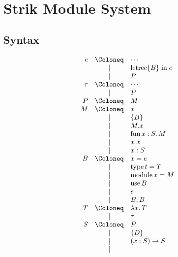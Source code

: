 \section{Strik Module System}

\subsection{Syntax}

\begin{align*}
  \begin{array}{rcl}
  e
  & \Coloneq & \cdots \\
  & \mid & \symletrec \{B\} \symin e \\
  & \mid & P \\
  \tau
  & \Coloneq & \cdots \\
  & \mid & P \\
  P
  & \Coloneq & M \\
  M
  & \Coloneq & x \\
  & \mid & \{B\} \\
  & \mid & M.x \\
  & \mid & \symfun x: S\ldotp M \\
  & \mid & x\; x \\
  & \mid & x: S \\
  B
  & \Coloneq & x = e \\
  & \mid & \symtype t = T \\
  & \mid & \symmodule x = M \\
  & \mid & \symuse B \\
  & \mid & \epsilon \\
  & \mid & B; B \\
  T
  & \Coloneq & \lambda x\ldotp T \\
  & \mid & \tau \\
  S
  & \Coloneq & P \\
  & \mid & \{D\} \\
  & \mid & (x: S) \to S \\
  & \mid &
  \end{array}
\end{align*}
